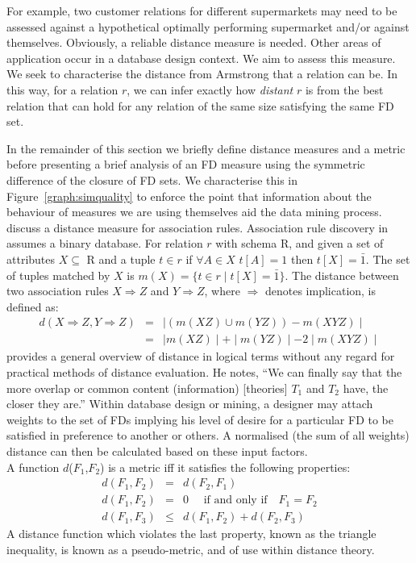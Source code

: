For example, two customer
relations for different supermarkets may need to be assessed
against a hypothetical optimally performing supermarket and/or
against themselves. Obviously, a reliable distance measure
is needed. Other areas of application occur in a database design
context. We aim to assess this measure. We seek to characterise the distance 
from Armstrong that a relation
can be. In this way, for a relation $r$, we can infer exactly how
{\em distant} $r$ is from the best relation that can hold for any
relation of the same size satisfying the same FD set.\\


\smallskip

In the remainder of this section we
briefly define distance measures and a metric before presenting a brief
analysis of an FD measure using the symmetric difference of the
closure of FD sets. We characterise this in Figure~\ref{graph:simquality}
to enforce the point that information about the behaviour of measures
we are using themselves aid the data mining process.
\cite{tkr95} discuss a distance measure for association rules. 
Association rule discovery in \cite{ais93} assumes a binary database.
For relation $r$ with schema R, and given a set of attributes
 $X \subseteq$ R and a tuple $t \in r$ if $\forall A \in X$ $t[A] = 1$  
then $t[X] = \bar{1}$.  The set of tuples matched by $X$ is
$m(X) = \{ t \in r \mid t[X] = \bar{1} \}$.  The distance between
two association rules $X \Rightarrow Z$ and $Y \Rightarrow Z$, where
$\Rightarrow$ denotes implication, is
defined as:
{\line
\begin{eqnarray*}
d(X \Rightarrow Z, Y \Rightarrow Z) & = & \mid (m(XZ) \cup m(YZ)) - m(XYZ) \mid \\
 				    & = & \mid m(XZ) \mid + \mid m(YZ) \mid - 2 \mid m(XYZ) \mid
\end{eqnarray*}
}
\cite{tuo78} provides a general overview of distance in logical
terms without any regard for practical methods of distance 
evaluation. He notes, ``We can finally say that the more
overlap or common content  (information) [theories] $T_1$ and $T_2$
have, the closer they are.'' Within database design or mining, a
designer may attach weights to the set of FDs implying his
level of desire for a particular FD to be satisfied in
preference to another or others. A normalised (the sum of
all weights) distance can then be calculated based on these
input factors. \\

A function $d$($F_1$,$F_2$) is a metric iff it satisfies the
following properties:
{\line
\begin{eqnarray*}
d(F_1,F_2) & = & d(F_2, F_1)  \\
d(F_1,F_2)   & = & 0 \quad\mbox{ if and only if}\quad F_1 = F_2  \\
d(F_1,F_3)   & \le & d(F_1,F_2) + d(F_2,F_3) 
\end{eqnarray*}
}
A distance function which violates the last property, known as the
triangle inequality, is known as a pseudo-metric, and of use within
distance theory. 

